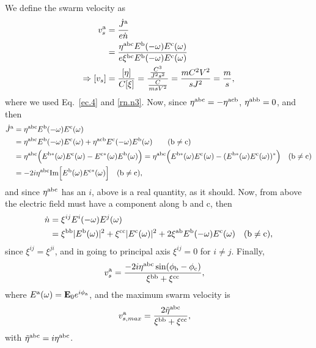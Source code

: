 \documentclass[floatfix,prb,aps,superscriptaddress,11pt]{revtex4}
\begin{document}
We define the swarm velocity as  
\begin{align}\label{sv.1}  
v^{\mathrm{a}}_s&=\frac{\dot J^{\mathrm{a}}}{e\dot n}
\nonumber\\
&=\frac{\eta^{\mathrm{a}\mathrm{b}\mathrm{c}}E^{\mathrm{b}}(-\omega)E^{\mathrm{c}}(\omega)}
{e\xi^{\mathrm{b}\mathrm{c}}E^{\mathrm{b}}(-\omega)E^{\mathrm{c}}(\omega)}
\nonumber\\
\Rightarrow[v_s]&=\frac{[\eta]}{C[\xi]}=\frac{\frac{C^3}{J^2s^2}}{\frac{C}{msV^2}}
=\frac{mC^2V^2}{sJ^2}=\frac{m}{s}
,
\end{align}  
where we used Eq.~\eqref{ec.4} and \eqref{rn.n3}.
Now, since 
$\eta^{\mathrm{a}\mathrm{b}\mathrm{c}}
=-\eta^{\mathrm{a}\mathrm{c}\mathrm{b}}$, $\eta^{\mathrm{a}\mathrm{b}\mathrm{b}}=0$, and then
\begin{align}\label{sv.2}
\dot J^{\mathrm{a}}
&=\eta^{\mathrm{a}\mathrm{b}\mathrm{c}}E^{\mathrm{b}}(-\omega)E^{\mathrm{c}}(\omega) 
\nonumber\\
&=\eta^{\mathrm{a}\mathrm{b}\mathrm{c}}E^{\mathrm{b}}(-\omega)E^{\mathrm{c}}(\omega) 
+
\eta^{\mathrm{a}\mathrm{c}\mathrm{b}}E^{\mathrm{c}}(-\omega)E^{\mathrm{b}}(\omega) \quad 
\quad(\mathrm{b}\neq\mathrm{c}) 
\nonumber\\
&=\eta^{\mathrm{a}\mathrm{b}\mathrm{c}}\Big(E^{\mathrm{b} *}(\omega)E^{\mathrm{c}}(\omega) 
-
E^{\mathrm{c} *}(\omega)E^{\mathrm{b}}(\omega)\Big) 
=\eta^{\mathrm{a}\mathrm{b}\mathrm{c}}\Big(E^{\mathrm{b} *}(\omega)E^{\mathrm{c}}(\omega) 
-
(E^{\mathrm{b} *}(\omega)E^{\mathrm{c}}(\omega))^*\Big) 
\quad(\mathrm{b}\neq\mathrm{c}) 
\nonumber\\
&=-2i\eta^{\mathrm{a}\mathrm{b}\mathrm{c}}\mathrm{Im}\Big[E^{\mathrm{b}}(\omega)E^{\mathrm{c} *}(\omega) \Big]
\quad(\mathrm{b}\neq\mathrm{c}) 
,
\end{align}
and since $\eta^{\mathrm{a}\mathrm{b}\mathrm{c}}$ has an $i$, above is a real quantity,
as it should. Now, from above the electric field must have a component
along b and c, then
\begin{align}\label{sv.3}
\dot n
&=\xi^{ij}E^i(-\omega)E^j(\omega) 
\nonumber\\
&=
\xi^{\mathrm{b}\mathrm{b}}|E^{\mathrm{b}}(\omega)|^2 +\xi^{\mathrm{c}\mathrm{c}}|E^{\mathrm{c}}(\omega)|^2 
+2 \xi^{\mathrm{a}\mathrm{b}}E^{\mathrm{b}}(-\omega)E^{\mathrm{c}}(\omega) 
\quad(\mathrm{b}\neq\mathrm{c}) 
,
\end{align}
since $\xi^{ij}=\xi^{ji}$, and in going to principal axis $\xi^{ij}=0$
for $i\neq j$. Finally,
\begin{align}\label{sv.4}  
v^{\mathrm{a}}_s&=
\frac  
{-2i\eta^{\mathrm{a}\mathrm{b}\mathrm{c}}\sin(\phi_{\mathrm{b}}-\phi_{\mathrm{c}})}
{\xi^{\mathrm{b}\mathrm{b}} +\xi^{\mathrm{c}\mathrm{c}}}
,
\end{align}  
where $E^{\mathrm{a}}(\omega)=\mathbf{E}_0e^{i\phi_{\mathrm{a}}}$, and the maximum swarm
velocity is
\begin{align}\label{sv.5} 
v^{\mathrm{a}}_{s,max}&=
\frac 
{2\tilde\eta^{\mathrm{a}\mathrm{b}\mathrm{c}}}
{\xi^{\mathrm{b}\mathrm{b}} +\xi^{\mathrm{c}\mathrm{c}}}
,
\end{align} 
with $\tilde\eta^{\mathrm{a}\mathrm{b}\mathrm{c}}=i\eta^{\mathrm{a}\mathrm{b}\mathrm{c}}$.
\end{document}
